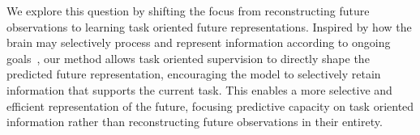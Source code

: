 \documentclass{article} %
\begin{document}
We explore this question by shifting the focus from reconstructing future observations to learning task oriented future representations. Inspired by how the brain may selectively process and represent information according to ongoing goals~\cite{nguyen2025cerebellar,gao2018cortico}, our method allows task oriented supervision to directly shape the predicted future representation, encouraging the model to selectively retain information that supports the current task. This enables a more selective and efficient representation of the future, focusing predictive capacity on task oriented information rather than reconstructing future observations in their entirety.




\end{document}
